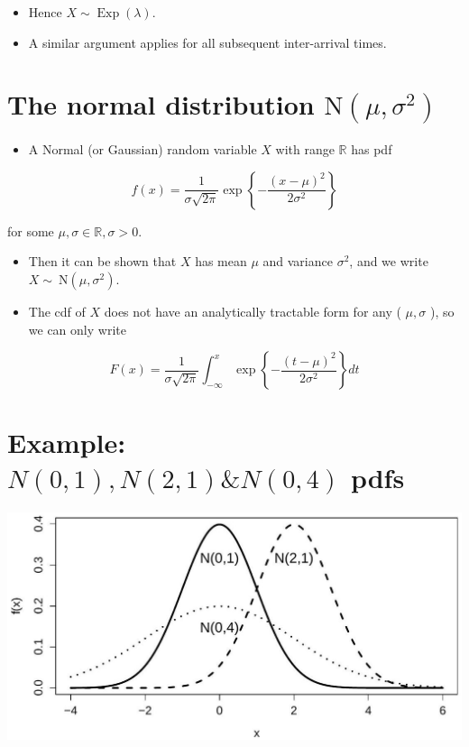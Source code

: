\documentclass[10pt]{article}
\begin{document}
\begin{itemize}
  \item Hence $X \sim \operatorname{Exp}(\lambda)$.
  \item A similar argument applies for all subsequent inter-arrival times.
\end{itemize}

\section*{The normal distribution $\mathrm{N}\left(\mu, \sigma^{2}\right)$}
\begin{itemize}
  \item A Normal (or Gaussian) random variable $X$ with range $\mathbb{R}$ has pdf
\end{itemize}

$$
f(x)=\frac{1}{\sigma \sqrt{2 \pi}} \exp \left\{-\frac{(x-\mu)^{2}}{2 \sigma^{2}}\right\}
$$

for some $\mu, \sigma \in \mathbb{R}, \sigma>0$.

\begin{itemize}
  \item Then it can be shown that $X$ has mean $\mu$ and variance $\sigma^{2}$, and we write $X \sim \mathrm{~N}\left(\mu, \sigma^{2}\right)$.
  \item The cdf of $X$ does not have an analytically tractable form for any ( $\mu, \sigma$ ), so we can only write
\end{itemize}

$$
F(x)=\frac{1}{\sigma \sqrt{2 \pi}} \int_{-\infty}^{x} \exp \left\{-\frac{(t-\mu)^{2}}{2 \sigma^{2}}\right\} d t
$$

\section*{Example: $N(0,1), N(2,1) \& N(0,4)$ pdfs}
\begin{center}
\includegraphics[max width=\textwidth]{2025_05_11_1201cfe24e14b364b4ecg-32}
\end{center}
\end{document}
